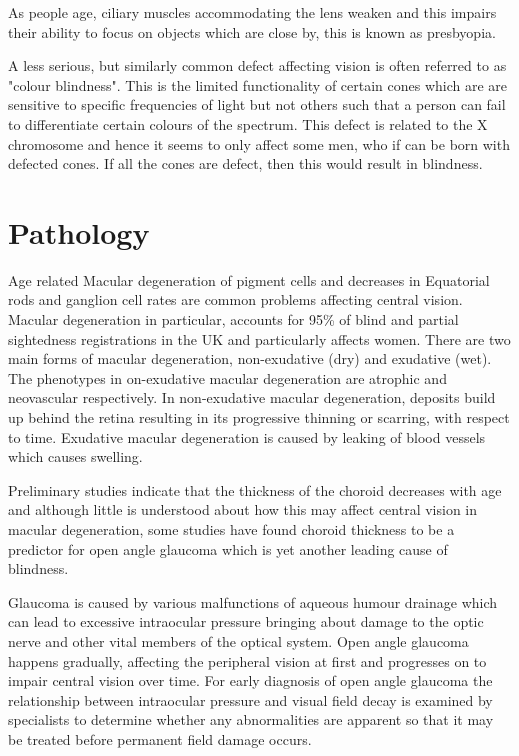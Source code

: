 As people age, ciliary muscles accommodating the lens weaken and
this impairs their ability to focus on objects which are close by, this is known as presbyopia.
\cite{fisher1985ciliary}

A less serious, but similarly common defect affecting vision is often referred
to as "colour blindness". This is the limited functionality of certain cones which
are are sensitive to specific frequencies of light but not others such that
a person can fail to differentiate certain colours of the spectrum.
This defect is related to the X chromosome and hence it seems to only affect some men,
who if can be born with defected cones.\cite{george1996clinical} If all
the cones are defect, then this would result in blindness.

 \section{Pathology}

Age related Macular degeneration of pigment cells and decreases in
Equatorial rods and ganglion cell rates are common problems affecting
central vision.\cite{gao1992aging} Macular degeneration in particular,
accounts for 95\% of blind and partial sightedness registrations in the
UK and particularly affects women.\cite{o1998age,klein2005complement}
There are two main forms of macular degeneration, non-exudative (dry)
and exudative (wet). The phenotypes in on-exudative macular degeneration
are atrophic and neovascular respectively.\cite{kuno2011dry} In
non-exudative macular degeneration, deposits build up behind the retina
resulting in its progressive thinning or scarring, with respect to time.
Exudative macular degeneration is caused by leaking of blood vessels
which causes swelling.

Preliminary studies indicate that the thickness of the choroid decreases
with age and although little is understood about how this may affect
central vision in macular degeneration, some studies have found
choroid thickness to be a predictor for open angle glaucoma which
is yet another leading cause of blindness.
\cite{margolis2009pilot,gordon2002ocular}

Glaucoma is caused by various malfunctions of aqueous humour drainage
which can lead to excessive intraocular pressure bringing about damage
to the optic nerve and other vital members of the optical system.
\cite{distelhorst2003open} Open angle glaucoma happens gradually,
affecting the peripheral vision at first and progresses on to impair
central vision over time. For early diagnosis of open angle glaucoma
the relationship between intraocular pressure and visual field decay
is examined by specialists to determine whether any abnormalities are
apparent so that it may be treated before permanent field damage occurs.
\cite{goldmann1972open}

